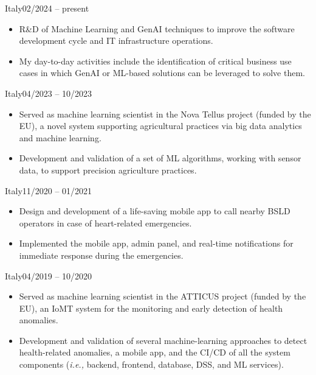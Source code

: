 
	{Italy}{02/2024 – present}
	\begin{itemize}
		\item R\&D of Machine Learning and GenAI techniques to improve the software development cycle and IT infrastructure operations.
		\item My day-to-day activities include the identification of critical business use cases in which GenAI or ML-based solutions can be leveraged to solve them.
	\end{itemize}
		
	\medskip

	{Italy}{04/2023 – 10/2023}
	\begin{itemize}
            \item Served as machine learning scientist in the Nova Tellus project (funded by the EU), a novel system supporting agricultural practices via big data analytics and machine learning.
            \item Development and validation of a set of ML algorithms, working with sensor data, to support precision agriculture practices.
	\end{itemize}
	
	\medskip

	{Italy}{11/2020 – 01/2021}
	\begin{itemize}
            \item Design and development of a life-saving mobile app to call nearby BSLD operators in case of heart-related emergencies.
            \item Implemented the mobile app, admin panel, and real-time notifications for immediate response during the emergencies.
	\end{itemize}
        	
	\medskip
	
	{Italy}{04/2019 – 10/2020}
	\begin{itemize}
		\item Served as machine learning scientist in the ATTICUS project (funded by the EU), an IoMT system for the monitoring and early detection of health anomalies.
		\item Development and validation of several machine-learning approaches to detect health-related anomalies, a mobile app, and the CI/CD of all the system components (\emph{i.e.,} backend, frontend, database, DSS, and ML services).
	\end{itemize}

